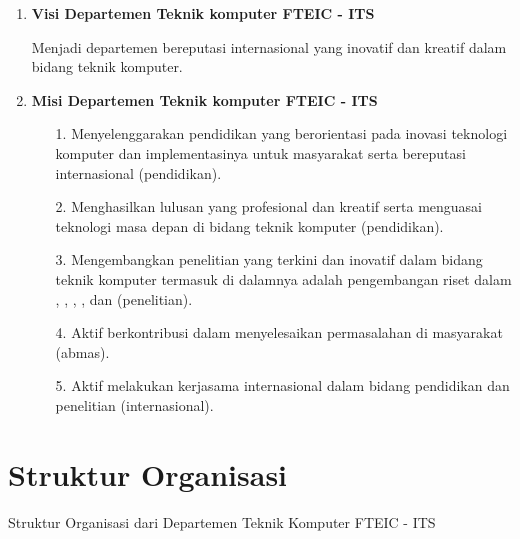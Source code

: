 \begin{enumerate}[nolistsep]

  \item \textbf{Visi Departemen Teknik komputer FTEIC - ITS}

	Menjadi departemen bereputasi internasional yang inovatif dan kreatif dalam bidang teknik komputer.

  \item \textbf{Misi Departemen Teknik komputer FTEIC - ITS}

  \begin{enumerate}[nolistsep]

    \item [1. ] Menyelenggarakan pendidikan yang berorientasi pada inovasi teknologi komputer dan implementasinya untuk masyarakat serta bereputasi internasional (pendidikan).

    \item [2. ] Menghasilkan lulusan yang profesional dan kreatif serta menguasai teknologi masa depan di bidang teknik komputer (pendidikan).

    \item [3. ] Mengembangkan penelitian yang terkini dan inovatif dalam bidang teknik komputer termasuk di dalamnya adalah pengembangan riset dalam , , , ,  dan  (penelitian).

    \item [4. ] Aktif berkontribusi dalam menyelesaikan permasalahan di masyarakat (abmas).

    \item [5. ] Aktif melakukan kerjasama internasional dalam bidang pendidikan dan penelitian (internasional).
  \end{enumerate}

\end{enumerate}

\section{Struktur Organisasi}

Struktur Organisasi dari Departemen Teknik Komputer FTEIC - ITS

